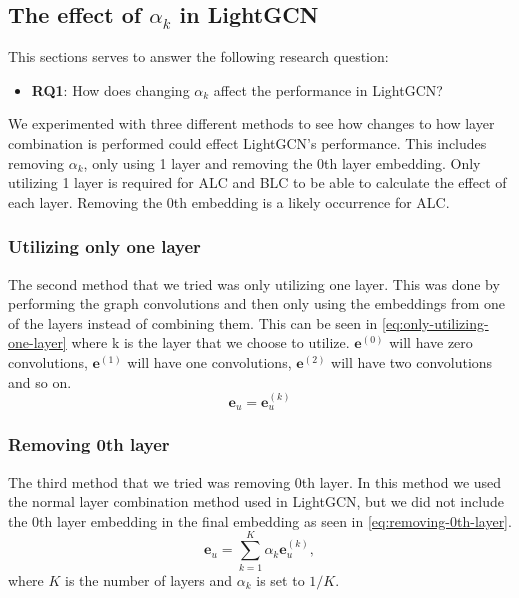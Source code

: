 \subsection{The effect of $\alpha_k$ in LightGCN}\label{sec:method:alpha-k-effect}
This sections serves to answer the following research question:
\begin{itemize}
	\item \textbf{RQ1}: How does changing $\alpha_k$ affect the performance in LightGCN?
\end{itemize}
We experimented with three different methods to see how changes to how layer combination is performed could effect LightGCN's performance.
This includes removing $\alpha_k$, only using 1 layer and removing the 0th layer embedding.
Only utilizing 1 layer is required for ALC and BLC to be able to calculate the effect of each layer.
Removing the 0th embedding is a likely occurrence for ALC.

\subsubsection{Utilizing only one layer}\label{subsubsec:only-1-layer}
The second method that we tried was only utilizing one layer.
This was done by performing the graph convolutions and then only using the embeddings from one of the layers instead of combining them.
This can be seen in \autoref{eq:only-utilizing-one-layer} where k is the layer that we choose to utilize. 
$\mathbf{e}^{(0)}$ will have zero convolutions, $\mathbf{e}^{(1)}$ will have one convolutions, $\mathbf{e}^{(2)}$ will have two convolutions and so on.
\begin{equation}
	\mathbf{e}_u = \mathbf{e}_u^{(k)}
	\label{eq:only-utilizing-one-layer}
\end{equation}

\subsubsection{Removing 0th layer}\label{subsubsec:remove-0-layer}
The third method that we tried was removing 0th layer.
In this method we used the normal layer combination method used in LightGCN, but we did not include the 0th layer embedding in the final embedding as seen in \autoref{eq:removing-0th-layer}.
\begin{equation}
	\mathbf{e}_u = \sum_{k=1}^{K} \alpha_k \mathbf{e}_u^{(k)},
	\label{eq:removing-0th-layer}
\end{equation}
where $K$ is the number of layers and $\alpha_k$ is set to $1/K$.
